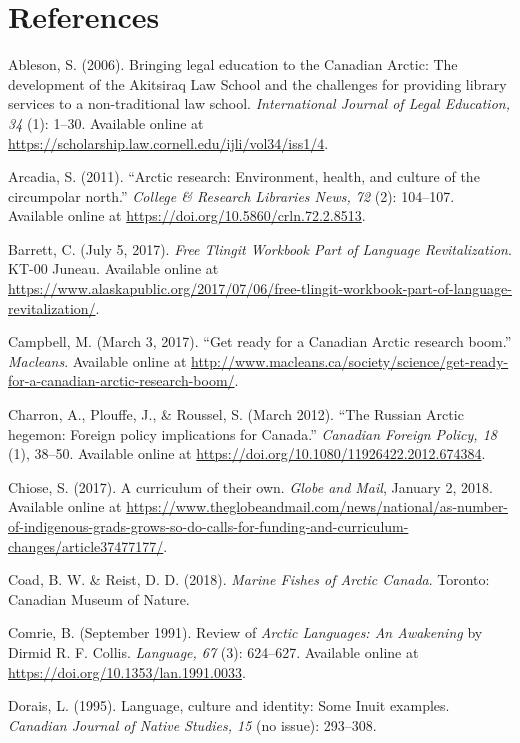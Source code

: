 \documentclass[a4paper,
fontsize=11pt,
oneside,
numbers=noperiodatend,
parskip=half-,
bibliography=totoc,
final
]{scrartcl}
\begin{document}
\hypertarget{references}{%
\section{\texorpdfstring{\textbf{References}}{References}}\label{references}}

Ableson, S. (2006). Bringing legal education to the Canadian Arctic: The
development of the Akitsiraq Law School and the challenges for providing
library services to a non-traditional law school. \emph{International
Journal of Legal Education, 34} (1): 1--30. Available online at
\url{https://scholarship.law.cornell.edu/ijli/vol34/iss1/4}.

Arcadia, S. (2011). \enquote{Arctic research: Environment, health, and
culture of the circumpolar north.} \emph{College \& Research Libraries
News, 72} (2): 104--107. Available online at
\url{https://doi.org/10.5860/crln.72.2.8513}.

Barrett, C. (July 5, 2017). \emph{Free Tlingit Workbook Part of Language
Revitalization}. KT-00 Juneau. Available online at
\url{https://www.alaskapublic.org/2017/07/06/free-tlingit-workbook-part-of-language-revitalization/}.

Campbell, M. (March 3, 2017). \enquote{Get ready for a Canadian Arctic
research boom.} \emph{Macleans}. Available online at
\url{http://www.macleans.ca/society/science/get-ready-for-a-canadian-arctic-research-boom/}.

Charron, A., Plouffe, J., \& Roussel, S. (March 2012). \enquote{The
Russian Arctic hegemon: Foreign policy implications for Canada.}
\emph{Canadian Foreign Policy, 18} (1), 38--50. Available online at
\url{https://doi.org/10.1080/11926422.2012.674384}.

Chiose, S. (2017). A curriculum of their own. \emph{Globe and Mail},
January 2, 2018. Available online at
\url{https://www.theglobeandmail.com/news/national/as-number-of-indigenous-grads-grows-so-do-calls-for-funding-and-curriculum-changes/article37477177/}.

Coad, B. W. \& Reist, D. D. (2018). \emph{Marine Fishes of Arctic
Canada}. Toronto: Canadian Museum of Nature.

Comrie, B. (September 1991). Review of \emph{Arctic Languages: An
Awakening} by Dirmid R. F. Collis. \emph{Language, 67} (3): 624--627.
Available online at \url{https://doi.org/10.1353/lan.1991.0033}.

Dorais, L. (1995). Language, culture and identity: Some Inuit examples.
\emph{Canadian Journal of Native Studies, 15} (no issue): 293--308.
\end{document}
